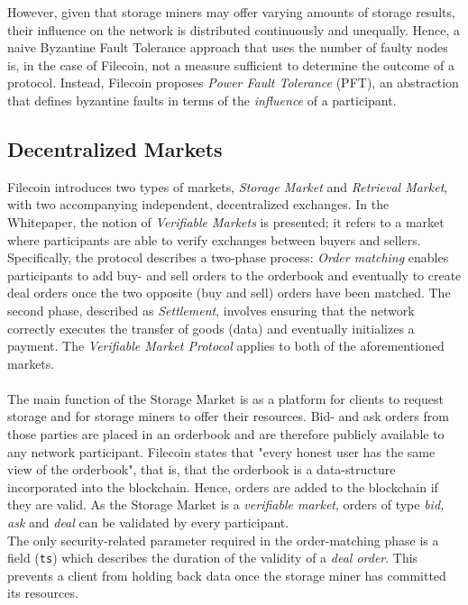 \documentclass[conference]{IEEEtran}
\begin{document}
However, given that storage miners may offer varying amounts of storage results, their influence on the network is distributed continuously and unequally.
Hence, a naive Byzantine Fault Tolerance approach that uses the number of faulty nodes is, in the case of Filecoin, not a measure sufficient to determine the outcome of a protocol.
Instead, Filecoin proposes \textit{Power Fault Tolerance} (PFT)\cite{filecoin-pft}, an abstraction that defines byzantine faults in terms of the \textit{influence} of a participant.


\subsection{Decentralized Markets}
\label{subsec:markets}
Filecoin introduces two types of markets, \textit{Storage Market} and \textit{Retrieval Market}, with two accompanying independent, decentralized exchanges.
In the Whitepaper, the notion of \textit{Verifiable Markets} is presented; it refers to a market where participants are able to verify exchanges between buyers and sellers.
Specifically, the protocol describes a two-phase process: \textit{Order matching} enables participants to add buy- and sell orders to the orderbook and eventually to create deal orders once the two opposite (buy and sell) orders have been matched.
The second phase, described as \textit{Settlement}, involves ensuring that the network correctly executes the transfer of goods (data) and eventually initializes a payment.
The \textit{Verifiable Market Protocol} applies to both of the aforementioned markets.\cite{filecoin}
\\
\\
The main function of the Storage Market is as a platform for clients to request storage and for storage miners to offer their resources. 
Bid- and ask orders from those parties are placed in an orderbook and are therefore publicly available to any network participant.
Filecoin states that "every honest user has the same view of the orderbook", that is, that the orderbook is a data-structure incorporated into the blockchain.
Hence, orders are added to the blockchain if they are valid.
As the Storage Market is a \textit{verifiable market}, orders of type \textit{bid, ask} and \textit{deal} can be validated by every participant.
\\
\indent
The only security-related parameter required in the order-matching phase is a field (\texttt{ts}) which describes the duration of the validity of a \textit{deal order}.
This prevents a client from holding back data once the storage miner has committed its resources.
\end{document}
